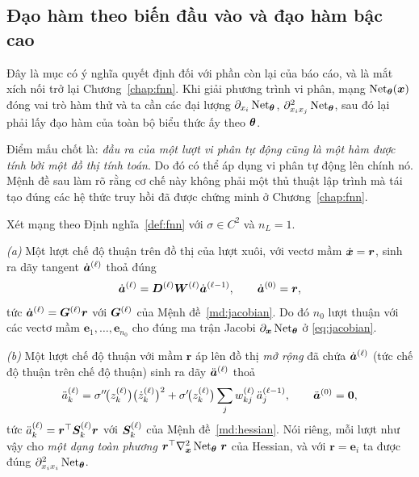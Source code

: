 \subsection{Đạo hàm theo biến đầu vào và đạo hàm bậc cao}
\label{subsec:bac-cao-ad}
 
Đây là mục có ý nghĩa quyết định đối với phần còn lại của báo cáo, và là mắt
xích nối trở lại Chương~\ref{chap:fnn}. Khi giải phương trình vi phân, mạng
$\operatorname{Net}_{\bm{\theta}}(\bm{x})$ đóng vai trò hàm thử và ta cần các đại lượng
$\partial_{x_i}\operatorname{Net}_{\bm{\theta}}$, $\partial^2_{x_ix_j}\operatorname{Net}_{\bm{\theta}}$, sau đó lại
phải lấy đạo hàm của toàn bộ biểu thức ấy theo $\bm{\theta}$.
 
Điểm mấu chốt là: \emph{đầu ra của một lượt vi phân tự động cũng là một hàm được
tính bởi một đồ thị tính toán}. Do đó có thể áp dụng vi phân tự động lên chính
nó. Mệnh đề sau làm rõ rằng cơ chế này không phải một thủ thuật lập trình mà tái
tạo đúng các hệ thức truy hồi đã được chứng minh ở Chương~\ref{chap:fnn}.
 
\begin{menhde}
\label{md:ad-tai-tao}
Xét mạng theo Định nghĩa~\ref{def:fnn} với $\sigma \in C^2$ và $n_L = 1$.
 
\emph{(a)} Một lượt chế độ thuận trên đồ thị của lượt xuôi, với vectơ mầm
$\dot{\bm{x}} = \bm{r}$, sinh ra dãy tangent $\dot{\bm{a}}^{(\ell)}$ thoả đúng
\begin{equation}
\dot{\bm{a}}^{(\ell)} = \bm{D}^{(\ell)}\bm{W}^{(\ell)}\dot{\bm{a}}^{(\ell-1)},
\qquad \dot{\bm{a}}^{(0)} = \bm{r},
\label{eq:ad-jvp}
\end{equation}
tức $\dot{\bm{a}}^{(\ell)} = \bm{G}^{(\ell)}\bm{r}$ với $\bm{G}^{(\ell)}$ của
Mệnh đề~\ref{md:jacobian}. Do đó $n_0$ lượt thuận với các vectơ mầm
$\bm{e}_1,\dots,\bm{e}_{n_0}$ cho đúng ma trận Jacobi
$\partial_{\bm{x}}\operatorname{Net}_{\bm{\theta}}$ ở \eqref{eq:jacobian}.
 
\emph{(b)} Một lượt chế độ thuận với mầm $\bm{r}$ áp lên đồ thị \emph{mở rộng}
đã chứa $\dot{\bm{a}}^{(\ell)}$ (tức chế độ thuận trên chế độ thuận) sinh ra dãy
$\ddot{\bm{a}}^{(\ell)}$ thoả
\begin{equation}
\ddot{a}^{(\ell)}_k
 = \sigma''\!\big(z^{(\ell)}_k\big)\big(\dot{z}^{(\ell)}_k\big)^2
 + \sigma'\!\big(z^{(\ell)}_k\big)
   \sum_{j} w^{(\ell)}_{kj}\,\ddot{a}^{(\ell-1)}_j,
\qquad \ddot{\bm{a}}^{(0)} = \bm{0},
\label{eq:ad-hvp}
\end{equation}
tức $\ddot{a}^{(\ell)}_k = \bm{r}^{\top}\bm{S}^{(\ell)}_k\bm{r}$ với
$\bm{S}^{(\ell)}_k$ của Mệnh đề~\ref{md:hessian}. Nói riêng, mỗi lượt như vậy cho
\emph{một dạng toàn phương} $\bm{r}^{\top}\nabla^2_{\bm{x}}\operatorname{Net}_{\bm{\theta}}\,\bm{r}$
của Hessian, và với $\bm{r} = \bm{e}_i$ ta được đúng
$\partial^2_{x_i x_i}\operatorname{Net}_{\bm{\theta}}$.
\end{menhde}
 
